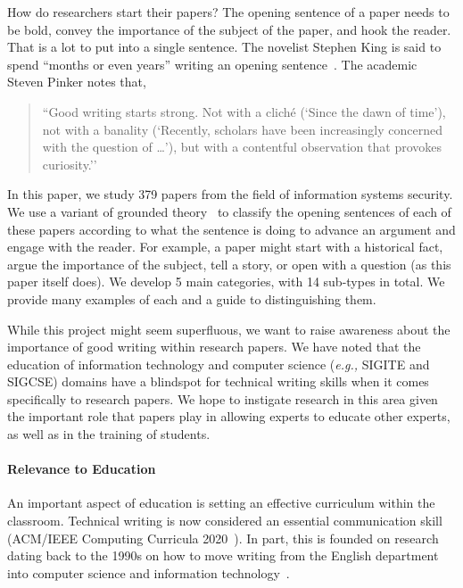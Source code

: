 \documentclass[sigconf,anonymous]{acmart}
\newcommand{\eg}{\textit{e.g.,}\xspace}
\begin{document}
	How do researchers start their papers? The opening sentence of a paper needs to be bold, convey the importance of the subject of the paper, and hook the reader. That is a lot to put into a single sentence. The novelist Stephen King is said to spend ``months or even years'' writing an opening sentence~\cite{Fas13}. The academic Steven Pinker notes that,
	
	\begin{quote}
		``Good writing starts strong. Not with a cliché (`Since the dawn of time’), not with a banality (`Recently, scholars have been increasingly concerned with the question of …’), but with a contentful observation that provokes curiosity.''~\cite{Pin15}
	\end{quote}
	
	In this paper, we study 379 papers from the field of information systems security. We use a variant of grounded theory~\cite{glaser1968discovery} to classify the opening sentences of each of these papers according to what the sentence is doing to advance an argument and engage with the reader. For example, a paper might start with a historical fact, argue the importance of the subject, tell a story, or open with a question (as this paper itself does). We develop 5 main categories, with 14 sub-types in total. We provide many examples of each and a guide to distinguishing them.
	
	While this project might seem superfluous, we want to raise awareness about the importance of good writing within research papers. We have noted that the education of information technology and computer science (\eg SIGITE and SIGCSE) domains have a blindspot for technical writing skills when it comes specifically to research papers. We hope to instigate research in this area given the important role that papers play in allowing experts to educate other experts, as well as in the training of students.
	
	\paragraph{Relevance to Education}
	
	An important aspect of education is setting an effective curriculum within the classroom. Technical writing is now considered an essential communication skill (ACM/IEEE Computing Curricula 2020~\cite{CC2020,CC2020report}). In part, this is founded on research dating back to the 1990s on how to move writing from the English department into computer science and information technology~\cite{Pes91,TP93,FPC96,Kay98}.
	
\end{document}
